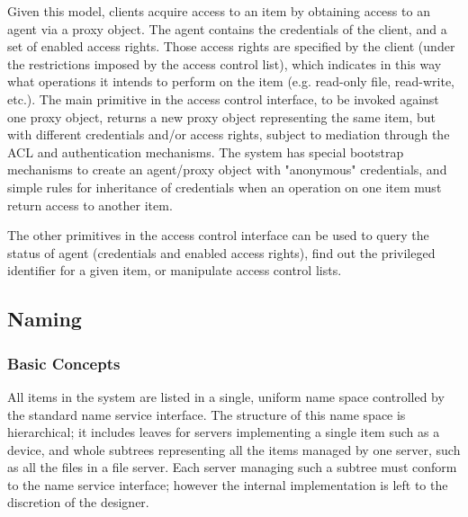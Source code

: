 Given this model, clients acquire access to an item by obtaining
access to an agent via a proxy object. The agent contains the
credentials of the client, and a set of enabled access rights. Those
access rights are specified by the client (under the restrictions
imposed by the access control list), which indicates in this way what
operations it intends to perform on the item (e.g. read-only file,
read-write, etc.). The main primitive in the access control interface,
to be invoked against one proxy object, returns a new proxy object
representing the same item, but with different credentials and/or
access rights, subject to mediation through the ACL and authentication
mechanisms. The system has special bootstrap mechanisms to create an
agent/proxy object with "anonymous" credentials, and simple rules for
inheritance of credentials when an operation on one item must return
access to another item.

The other primitives in the access control interface can be used to
query the status of agent (credentials and enabled access rights),
find out the privileged identifier for a given item, or manipulate
access control lists.


\subsection{Naming}

\subsubsection{Basic Concepts}

All items in the system are listed in a single, uniform name space
controlled by the standard name service interface. The structure of
this name space is hierarchical; it includes leaves for servers
implementing a single item such as a device, and whole subtrees
representing all the items managed by one server, such as all the files
in a file server. Each server managing such a subtree must conform to
the name service interface; however the internal implementation is
left to the discretion of the designer.


